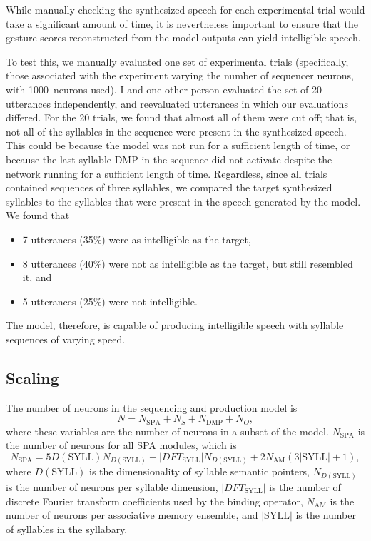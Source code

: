 While manually checking the synthesized speech
for each experimental trial
would take a significant amount of time,
it is nevertheless important
to ensure that the gesture scores
reconstructed from the model outputs
can yield intelligible speech.

To test this, we manually evaluated
one set of experimental trials
(specifically, those associated with
the experiment varying the number of
sequencer neurons,
with 1000~neurons used).
I and one other person evaluated
the set of 20 utterances independently,
and reevaluated utterances
in which our evaluations differed.
For the 20 trials,
we found that
almost all of them were cut off;
that is, not all of the syllables
in the sequence were present
in the synthesized speech.
This could be because the model
was not run for a sufficient length of time,
or because the last syllable DMP in the sequence
did not activate
despite the network running
for a sufficient length of time.
Regardless, since all trials
contained sequences of three syllables,
we compared the target synthesized syllables
to the syllables that were present
in the speech generated by the model.
We found that
\begin{itemize}
  \item 7 utterances (35\%) were as intelligible as the target,
  \item 8 utterances (40\%) were not as intelligible as the target,
    but still resembled it, and
  \item 5 utterances (25\%) were not intelligible.
\end{itemize}

The model, therefore,
is capable of producing intelligible speech
with syllable sequences of varying speed.

\subsection{Scaling}
\label{sec:res-prod-scaling}

The number of neurons in the
sequencing and production model is
\begin{equation}
  N = N_{\text{SPA}} + N_S + N_{\text{DMP}} + N_O,
\end{equation}
where these variables
are the number of neurons in
a subset of the model.
$N_{\text{SPA}}$ is the number of
neurons for all SPA modules,
which is
\begin{equation}
  N_{\text{SPA}} = 5 D(\text{SYLL}) N_{D(\text{SYLL})} +
      |DFT_{\text{SYLL}}| N_{D(\text{SYLL})}
      + 2 N_{\text{AM}} (3 |\text{SYLL}| + 1),
\end{equation}
where $D(\text{SYLL})$ is the dimensionality
of syllable semantic pointers,
$N_{D(\text{SYLL})}$ is the number of neurons
per syllable dimension,
$|DFT_{\text{SYLL}}|$ is the number of
discrete Fourier transform coefficients
used by the binding operator,
$N_{\text{AM}}$ is the number of neurons
per associative memory ensemble,
and $|\text{SYLL}|$ is the number of
syllables in the syllabary.

